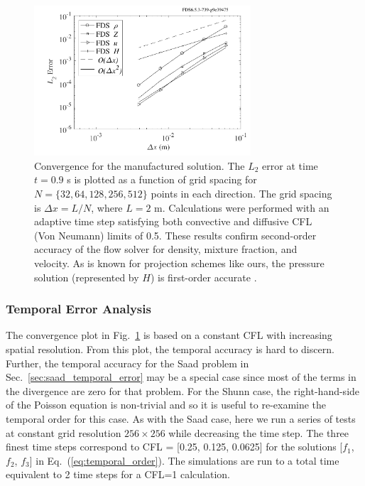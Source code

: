 \documentclass[11pt]{book}
\begin{document}
\begin{figure}[ht]
\centering
\includegraphics[height=2.2in]{SCRIPT_FIGURES/shunn_mms_convergence}
\caption[Convergence of the manufactured solution]{\label{fig_mms_convergence} Convergence for the manufactured solution.  The $L_2$ error at time $t = 0.9$ s is plotted as a function of grid spacing for $N=\{32,64,128,256,512\}$ points in each direction.  The grid spacing is $\Delta x = L/N$, where $L=2$ m.  Calculations were performed with an adaptive time step satisfying both convective and diffusive CFL (Von Neumann) limits of 0.5. These results confirm second-order accuracy of the flow solver for density, mixture fraction, and velocity. As is known for projection schemes like ours, the pressure solution (represented by $H$) is first-order accurate \cite{Armfield:2002}.}
\end{figure}

\subsubsection*{Temporal Error Analysis}

The convergence plot in Fig.~\ref{fig_mms_convergence} is based on a constant CFL with increasing spatial resolution.  From this plot, the temporal accuracy is hard to discern.  Further, the temporal accuracy for the Saad problem in Sec.~\ref{sec:saad_temporal_error} may be a special case since most of the terms in the divergence are zero for that problem.  For the Shunn case, the right-hand-side of the Poisson equation is non-trivial and so it is useful to re-examine the temporal order for this case.  As with the Saad case, here we run a series of tests at constant grid resolution $256 \times 256$ while decreasing the time step.  The three finest time steps correspond to CFL = [0.25, 0.125, 0.0625] for the solutions [$f_1$, $f_2$, $f_3$] in Eq.~(\ref{eq:temporal_order}).  The simulations are run to a total time equivalent to 2 time steps for a CFL=1 calculation.
\end{document}
